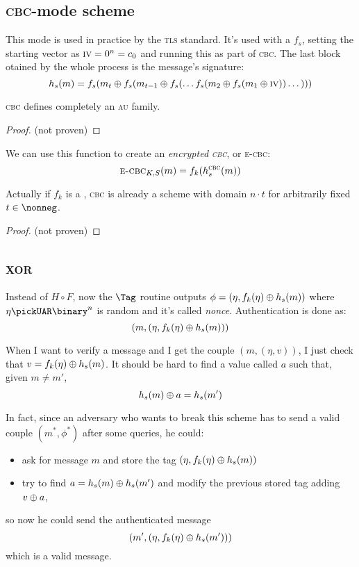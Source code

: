 \subsection{\textsc{cbc}-mode \mac{} scheme}
This mode is used in practice by the \textsc{tls} standard. It's used with a \prf{} $f_s$, setting the starting vector as $\textsc{iv} = 0^n = c_0$ and running this \prf{} as part of \textsc{cbc}. The last block otained by the whole process is the message's signature:
\[
    h_s(m) = f_s(m_t \oplus f_s(m_{t-1} \oplus f_s(\dots f_s(m_2 \oplus f_s(m_1 \oplus \textsc{iv})) \dots)))
\]
\begin{lemma}
    \textsc{cbc} \mac{} defines completely an \textsc{au} family.
\end{lemma}

\begin{proof}
    (not proven)
\end{proof}

We can use this function to create an \emph{encrypted \textsc{cbc}}, or \textsc{e-cbc}:
\[
    \textsc{e-cbc}_{K, S}(m) = f_{k}(h_s^{\textsc{cbc}}(m))
\]

\begin{theorem}
    Actually if $f_k$ is a \prf, \textsc{cbc} \mac{} is already a \mac{} scheme with domain $n \cdot t$ for arbitrarily fixed $t \in \nonneg$.
\end{theorem}

\begin{proof}
    (not proven)
\end{proof}

\subsection{\textsc{xor} \mac}
Instead of $H \circ F$, now the $\Tag$ routine outputs $\phi = (\eta , f_k(\eta) \oplus h_s(m))$ where $\eta \pickUAR \binary^n$ is random and it's called \textit{nonce}. Authentication is done as:
\[
    (m, (\eta, f_k(\eta) \oplus h_s(m)))
\]

When I want to verify a message and I get the couple $(m, (\eta, v))$, I just check that $v = f_k(\eta) \oplus h_s(m)$. It should be hard to find a value called $a$ such that, given $m \neq m'$, 
\[
    h_s(m) \oplus a = h_s(m')
\]

In fact, since an adversary who wants to break this scheme has to send a valid couple $(m^*, \phi^*)$ after some queries, he could:
\begin{itemize}
    \item ask for message $m$ and store the tag $(\eta, f_k(\eta) \oplus h_s(m))$
    \item try to find $a = h_s(m) \oplus h_s(m')$ and modify the previous stored tag adding $v \oplus a$, 
\end{itemize}
so now he could send the authenticated message
\[
    (m', (\eta, f_k(\eta) \oplus h_s(m'))) 
\]
which is a valid message.

